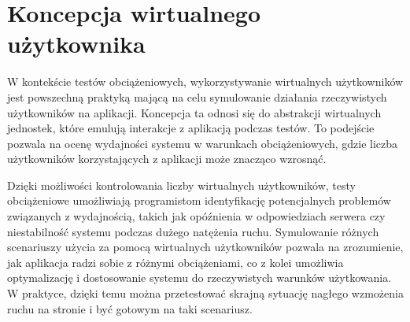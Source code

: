 \section{Koncepcja wirtualnego użytkownika}

W kontekście testów obciążeniowych, wykorzystywanie wirtualnych użytkowników jest powszechną praktyką mającą na celu symulowanie działania rzeczywistych użytkowników na aplikacji. Koncepcja ta odnosi się do abstrakcji wirtualnych jednostek, które emulują interakcje z aplikacją podczas testów. To podejście pozwala na ocenę wydajności systemu w warunkach obciążeniowych, gdzie liczba użytkowników korzystających z aplikacji może znacząco wzrosnąć.


Dzięki możliwości kontrolowania liczby wirtualnych użytkowników, testy obciążeniowe umożliwiają programistom identyfikację potencjalnych problemów związanych z wydajnością, takich jak opóźnienia w odpowiedziach serwera czy niestabilność systemu podczas dużego natężenia ruchu. Symulowanie różnych scenariuszy użycia za pomocą wirtualnych użytkowników pozwala na zrozumienie, jak aplikacja radzi sobie z różnymi obciążeniami, co z kolei umożliwia optymalizację i dostosowanie systemu do rzeczywistych warunków użytkowania. W praktyce, dzięki temu można przetestować skrajną sytuację nagłego wzmożenia ruchu na stronie i być gotowym na taki scenariusz.